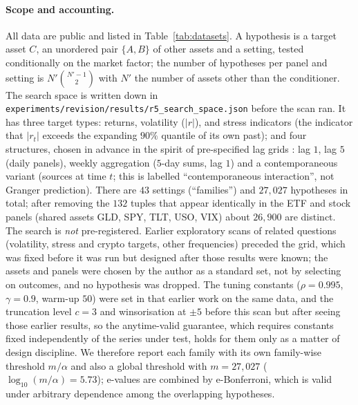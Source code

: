 \documentclass[pdflatex,sn-mathphys-ay]{sn-jnl}%
\theoremstyle{thmstyleone}%
\theoremstyle{thmstyletwo}%
\theoremstyle{thmstylethree}%
\begin{document}
\paragraph{Scope and accounting.} All data are public and listed in Table~\ref{tab:datasets}. A hypothesis is a target asset $C$, an unordered pair $\{A,B\}$ of other assets and a setting, tested conditionally on the market factor;
the number of hypotheses per panel and setting is $N'\binom{N'-1}{2}$ with $N'$ the number of assets other than the conditioner. The search space is written down in \texttt{experiments/revision/results/r5\_search\_space.json} before the scan ran.
It has three target types: returns, volatility ($|r|$), and stress indicators (the indicator that $|r_t|$ exceeds the expanding $90\%$ quantile of its own past); and four structures, chosen in advance in the spirit of pre-specified lag grids \citep{choi2026}: lag $1$, lag $5$ (daily panels), weekly aggregation ($5$-day sums, lag $1$) and
a contemporaneous variant (sources at time $t$; this is labelled ``contemporaneous interaction'', not Granger prediction). There are $43$ settings (``families'') and $27{,}027$ hypotheses in total; after removing the $132$ tuples that appear identically in the ETF
and stock panels (shared assets GLD, SPY, TLT, USO, VIX) about $26{,}900$ are distinct. The search is \emph{not} pre-registered. Earlier exploratory scans of related questions (volatility, stress and crypto targets, other frequencies) preceded the grid, which was fixed before it was run but designed after those
results were known; the assets and panels were chosen by the author as a standard set, not by selecting on outcomes, and no hypothesis was dropped. The tuning constants ($\rho=0.995$, $\gamma=0.9$, warm-up $50$) were set in that earlier work on the same data, and the truncation level $c=3$ and winsorisation at $\pm5$ before this scan
but after seeing those earlier results, so the anytime-valid guarantee, which requires constants fixed independently of the series under test, holds for them only as a matter of design discipline. We therefore report each family with its own
family-wise threshold $m/\alpha$ and also a global threshold with $m=27{,}027$ ($\log_{10}(m/\alpha)=5.73$); e-values are combined by e-Bonferroni, which is valid under arbitrary dependence among the overlapping hypotheses.
\end{document}
